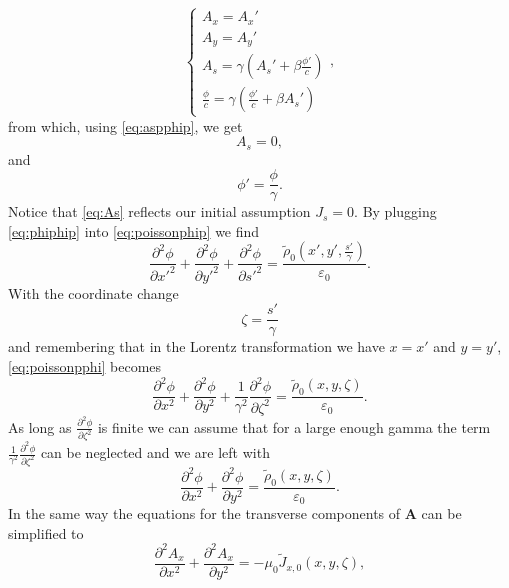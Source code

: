 \begin{equation*}
    \begin{cases}
        A_x = A_x'\\
        A_y = A_y'\\
        A_s = \gamma(A_s' + \beta \frac{\phi'}{c})\\
        \frac{\phi}{c} = \gamma(\frac{\phi'}{c} + \beta A_s')
    \end{cases},
\end{equation*}
from which, using \ref{eq:aspphip}, we get
\begin{equation}
    A_s = 0,
    \label{eq:As}
\end{equation}
and 
\begin{equation}
    \phi' = \frac{\phi}{\gamma}.
    \label{eq:phiphip}
\end{equation}
Notice that \ref{eq:As} reflects our initial assumption $J_s=0$. By plugging \ref{eq:phiphip} into \ref{eq:poissonphip} we find
\begin{equation*}
    \frac{\partial^2 \phi}{\partial x'^2} + \frac{\partial^2 \phi}{\partial y'^2} + \frac{\partial^2 \phi}{\partial s'^2} = \frac{ \tilde{\rho}_0\left(x', y', \frac{s'}{\gamma}\right)}{\varepsilon_0}.
    \label{eq:poissonpphi}
\end{equation*}
With the coordinate change $$\zeta=\frac{s'}{\gamma}$$
and remembering that in the Lorentz transformation we have $x=x'$ and $y=y'$, \ref{eq:poissonpphi} becomes  
\begin{equation}
    \frac{\partial^2 \phi}{\partial x^2} + \frac{\partial^2 \phi}{\partial y^2} + \frac{1}{\gamma^2}\frac{\partial^2 \phi}{\partial \zeta^2} = \frac{ \tilde{\rho}_0\left(x, y, \zeta\right)}{\varepsilon_0}.
    \label{eq:poissonphi}
\end{equation}
As long as $\frac{\partial^2 \phi}{\partial \zeta^2}$ is finite we can assume that for a large enough gamma the term $\frac{1}{\gamma^2}\frac{\partial^2 \phi}{\partial \zeta^2}$ can be neglected and we are left with
\begin{equation}
    \frac{\partial^2 \phi}{\partial x^2} + \frac{\partial^2 \phi}{\partial y^2} = \frac{ \tilde{\rho}_0\left(x, y, \zeta\right)}{\varepsilon_0}.
    \label{eq:2Dpoissonphi}
\end{equation}
In the same way the equations for the transverse components of $\mathbf{A}$ can be simplified to
\begin{equation}
    \frac{\partial^2 A_x}{\partial x^2} + \frac{\partial^2 A_x}{\partial y^2} = -\mu_0 \tilde{J}_{x,0}\left(x, y, \zeta\right),
    \label{eq:2DpoissonAx}
\end{equation}
